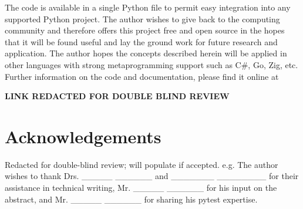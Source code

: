 \documentclass[10pt, conference]{IEEEtran}
\begin{document}
The code is available in a single Python file to permit 
easy integration into any supported Python project.
The author wishes to give back to the computing community
and therefore offers this project free and open source
in the hopes that it will be found useful and lay the ground
work for future research and application.
The author hopes the concepts described herein will be 
applied in other languages with strong metaprogramming support
such as C\#, Go, Zig, etc. Further information on the code and  documentation, please
find it online at
\begin{center}
  \textbf{LINK REDACTED FOR DOUBLE BLIND REVIEW}
\end{center}


 \section{Acknowledgements}\label{sec:acknowledgements}

Redacted for double-blind review; will populate if accepted.  e.g.
The author wishes to thank Drs. \_\_\_\_\_ \_\_\_\_\_\_ and \_\_\_\_\_\_\_ \_\_\_\_\_\_\_\_
for their assistance in technical writing, Mr. \_\_\_\_\_ \_\_\_\_\_\_
for his input on the abstract, and Mr. \_\_\_\_\_ \_\_\_\_\_\_ for sharing his pytest
expertise.



 \newpage



\end{document}
